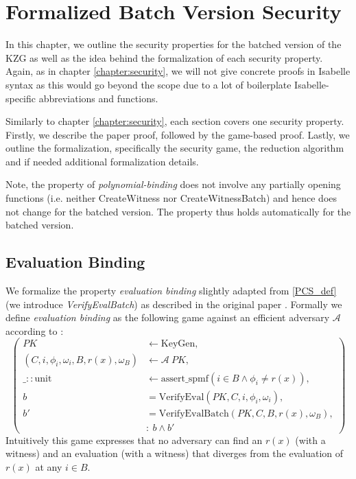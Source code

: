 \chapter{Formalized Batch Version Security}\label{chapter:batch_security}
In this chapter, we outline the security properties for the batched version of the KZG as well as the idea behind the formalization of each security property. Again, as in chapter \ref{chapter:security}, we will not give concrete proofs in Isabelle syntax as this would go beyond the scope due to a lot of boilerplate Isabelle-specific abbreviations and functions.

Similarly to chapter \ref{chapter:security}, each section covers one security property. Firstly, we describe the paper proof, followed by the game-based proof. Lastly, we outline the formalization, specifically the security game, the reduction algorithm and if needed additional formalization details.

Note, the property of \textit{polynomial-binding} does not involve any partially opening functions (i.e. neither CreateWitness nor CreateWitnessBatch) and hence does not change for the batched version. The property thus holds automatically for the batched version.

\section{Evaluation Binding}
We formalize the property \textit{evaluation binding} slightly adapted from \ref{PCS_def} (we introduce \textit{VerifyEvalBatch}) as described in the original paper \parencite{KZG}. Formally we define \textit{evaluation binding} as the following game against an efficient adversary $\mathcal{A}$ according to \parencite{KZG}: 
\begin{equation*}
    \left(
        \begin{aligned}
            PK & \leftarrow \text{KeyGen}, \\
            (C, i,\phi_i,\omega_i, B, r(x),\omega_B) & \leftarrow \mathcal{A} \ PK, \\
            \_::\text{unit} & \leftarrow \text{assert\_spmf}(i\in B \land \phi_i \ne r(x)), \\
            b &= \text{VerifyEval}(PK, C, i, \phi_i, \omega_i),\\
            b' &= \text{VerifyEvalBatch}(PK, C, B, r(x), \omega_B),\\
            & : \ b \land b'
        \end{aligned}
        \right)
\end{equation*}
Intuitively this game expresses that no adversary can find an $r(x)$ (with a witness) and an evaluation (with a witness) that diverges from the evaluation of $r(x)$ at any $i \in B$.

